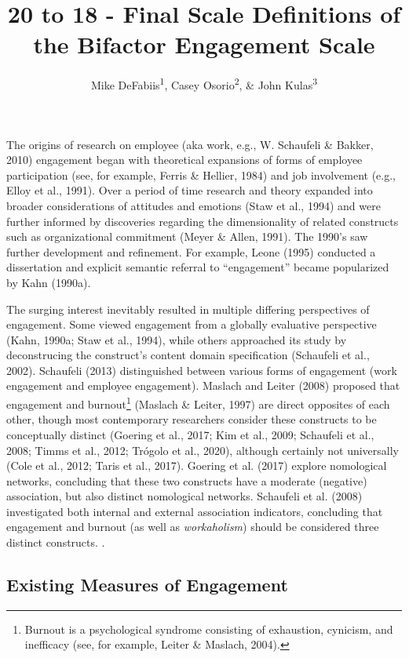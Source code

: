 \documentclass[
  man]{apa6}
\title{20 to 18 - Final Scale Definitions of the Bifactor Engagement Scale}
\author{Mike DeFabiis\textsuperscript{1}, Casey Osorio\textsuperscript{2}, \& John Kulas\textsuperscript{3}}
\date{}
\affiliation{\vspace{0.5cm}\textsuperscript{1} Montclair State University\\\textsuperscript{2} Harver\\\textsuperscript{3} eRg}
\begin{document}
\maketitle

The origins of research on employee (aka work, e.g., W. Schaufeli \& Bakker, 2010) engagement began with theoretical expansions of forms of employee participation (see, for example, Ferris \& Hellier, 1984) and job involvement (e.g., Elloy et al., 1991). Over a period of time research and theory expanded into broader considerations of attitudes and emotions (Staw et al., 1994) and were further informed by discoveries regarding the dimensionality of related constructs such as organizational commitment (Meyer \& Allen, 1991). The 1990's saw further development and refinement. For example, Leone (1995) conducted a dissertation and explicit semantic referral to ``engagement'' became popularized by Kahn (1990a).

The surging interest inevitably resulted in multiple differing perspectives of engagement. Some viewed engagement from a globally evaluative perspective (Kahn, 1990a; Staw et al., 1994), while others approached its study by deconstrucing the construct's content domain specification (Schaufeli et al., 2002). Schaufeli (2013) distinguished between various forms of engagement (work engagement and employee engagement). Maslach and Leiter (2008) proposed that engagement and burnout\footnote{Burnout is a psychological syndrome consisting of exhaustion, cynicism, and inefficacy (see, for example, Leiter \& Maslach, 2004).} (Maslach \& Leiter, 1997) are direct opposites of each other, though most contemporary researchers consider these constructs to be conceptually distinct (Goering et al., 2017; Kim et al., 2009; Schaufeli et al., 2008; Timms et al., 2012; Trógolo et al., 2020), although certainly not universally (Cole et al., 2012; Taris et al., 2017). Goering et al. (2017) explore nomological networks, concluding that these two constructs have a moderate (negative) association, but also distinct nomological networks. Schaufeli et al. (2008) investigated both internal and external association indicators, concluding that engagement and burnout (as well as \emph{workaholism}) should be considered three distinct constructs. .

\hypertarget{existing-measures-of-engagement}{%
\subsection{Existing Measures of Engagement}\label{existing-measures-of-engagement}}
\end{document}
